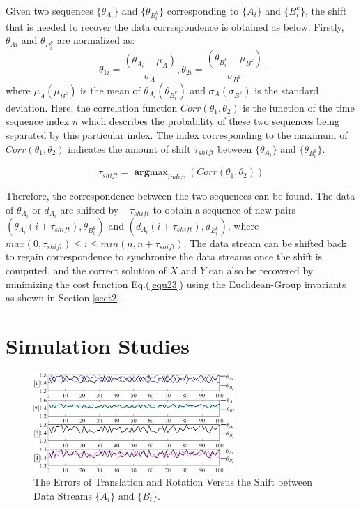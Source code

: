 \documentclass[letterpaper, 10 pt, conference]{ieeeconf}  %
\begin{document}
Given two sequences $\{\theta_{A_{i}}\}$ and $\{\theta_{B_{i}^{k}}\}$ corresponding to  $\{A_{i}\}$ and $\{B_{i}^{k}\}$, the shift that is needed to recover the data correspondence is obtained as below.
Firstly, $\theta_{Ai}$ and $\theta_{B_{i}^{k}}$ are normalized as:
{\color{red}
\begin{equation}\label{equ29}
    \theta_{1i}=\frac{(\theta_{A_{i}}-\mu_{A})}{\sigma_{A}}, \theta_{2i}=\frac{(\theta_{B_{i}^{k}}-\mu_{B^{k}})}{\sigma_{B^{k}}}
\end{equation}
where $\mu_{A}(\mu_{B^{k}})$ is the mean of $\theta_{A_{i}}(\theta_{B_{i}^{k}})$ and $\sigma_{A}(\sigma_{B^{k}})$ is the standard deviation.
}
Here, the correlation function $Corr(\theta_{1},\theta_{2})$  is the function of the time sequence index $n$ which describes the probability of these two sequences being separated by this particular index. The index corresponding to the maximum of $Corr(\theta_{1},\theta_{2})$  indicates the amount of shift $\tau_{shift}$ between $\{\theta_{A_{i}}\}$ and $\{\theta_{B_{i}^{k}}\}$.

\begin{equation}\label{equ30}
    \tau_{shift} = \mathop{\mathbf{arg}max}_{index}(Corr(\theta_{1},\theta_{2}))
\end{equation}

Therefore, the correspondence between the two sequences can be found. The data of ${\theta_{A_{i}}}$ or ${d_{A_{i}}}$ are shifted by $-\tau_{shift}$ to obtain a sequence of new pairs $({\theta_{A_{i}}(i+\tau_{shift})},{\theta_{B_{i}^{k}}})$ and $({d_{A_{i}}(i+\tau_{shift})},{d_{B_{i}^{k}}})$, where $max(0,\tau_{shift})\leq i \leq min(n,n+\tau_{shift})$. The data stream can be shifted back to regain correspondence to synchronize the data streams once the shift is computed, and the correct solution of $X$ and $Y$ can also be recovered by minimizing the cost function Eq.(\ref{equ23}) using the Euclidean-Group invariants as shown in Section \ref{sect2}.


\section{Simulation Studies}
\label{sect4}

\begin{center}
\begin{figure}
\centering
\includegraphics[width=3in]{fig2.eps}
\caption{
The Errors of Translation and Rotation Versus the Shift between Data Streams $\{A_i\}$ and $\{B_i\}$.
}
\label{fig2}
\end{figure}
\end{center}
\end{document}
